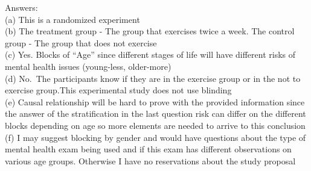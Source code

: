 \documentclass[
]{article}
\begin{document}
Answers:\\
(a) This is a randomized experiment\\
(b) The treatment group - The group that exercises twice a week. The
control group - The group that does not exercise\\
(c) Yes. Blocks of ``Age'' since different stages of life will have
different risks of mental health issues (young-less, older-more)\\
(d) No.~The participants know if they are in the exercise group or in
the not to exercise group.This experimental study does not use
blinding\\
(e) Causal relationship will be hard to prove with the provided
information since the answer of the stratification in the last question
risk can differ on the different blocks depending on age so more
elements are needed to arrive to this conclusion\\
(f) I may suggest blocking by gender and would have questions about the
type of mental health exam being used and if this exam has different
observations on various age groups. Otherwise I have no reservations
about the study proposal\\
\end{document}
